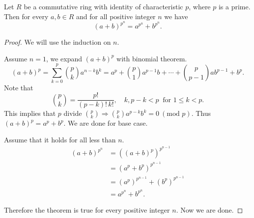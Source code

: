 \begin{lemma}
    Let $R$ be a commutative ring with identity of characteristic $p$, where $p$ is a prime.
    Then for every $a, b \in R$ and for all positive integer $n$ we have 
    \begin{equation}
        (a + b)^{p^n} = a^{p^n} + b^{p^n}.
    \end{equation}
\end{lemma}
\begin{proof}
    We will use the induction on $n$. 
    
    Assume $n = 1$, we expand $(a+b)^p$ with binomial theorem.
    \[
        (a+b)^p = \sum^p_{k=0} {p \choose k} a^{n-k}b^k = a^p + 
        {p \choose 1} a^{p-1}b + \cdots + {p \choose p-1} ab^{p-1} + b^p.
    \]
    Note that 
    \[
        {p \choose k} = \frac{p!}{(p-k)!\, k!}, \quad k, p-k < p \> \text{ for } 1 \leq k < p.
    \]
    This implies that $p$ divide ${p \choose k} \Longrightarrow 
    {p \choose k}a^{p-k}b^k = 0 \> (\text{mod } p)$. Thus $(a+b)^p = a^p + b^p$. 
    We are done for base case.

    Assume that it holds for all less than $n$.
    \begin{align*}
        (a+b)^{p^n} &= \left( (a+b)^p \right)^{p^{n-1}} \\
        &= (a^p + b^p)^{p^{n-1}}\\
        &= (a^p)^{p^{n-1}} + (b^p)^{p^{n-1}}\\
        &= a^{p^n} + b^{p^n}.
    \end{align*}

    Therefore the theorem is true for every positive integer $n$. Now we are done.
\end{proof}

